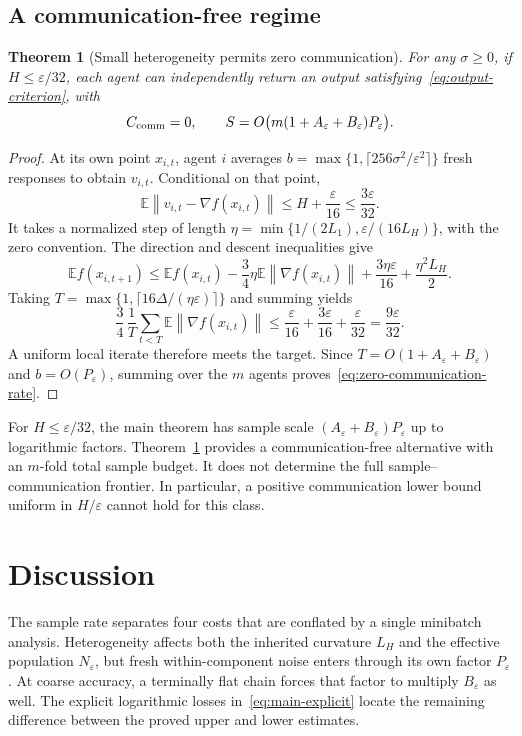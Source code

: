 \documentclass[11pt,a4paper]{article}
\newcommand{\E}{\mathbb{E}}
\newcommand{\eps}{\varepsilon}
\newcommand{\norm}[1]{\left\lVert #1\right\rVert}
\newtheorem{theorem}{Theorem}[section]
\theoremstyle{remark}
\begin{document}
\subsection{A communication-free regime}

\begin{theorem}[Small heterogeneity permits zero communication]
\label{thm:zero-communication}
For any $\sigma\ge0$, if $H\le\eps/32$, each agent can independently
return an output satisfying~\eqref{eq:output-criterion}, with
\begin{equation}
 C_{\rm comm}=0,\qquad
 S=O\bigl(m(1+A_\eps+B_\eps)P_\eps\bigr).
 \label{eq:zero-communication-rate}
\end{equation}
\end{theorem}

\begin{proof}
At its own point $x_{i,t}$, agent $i$ averages
$b=\max\{1,\lceil256\sigma^2/\eps^2\rceil\}$ fresh responses to obtain
$v_{i,t}$. Conditional on that point,
\[
 \E\norm{v_{i,t}-\nabla f(x_{i,t})}
 \le H+\frac{\eps}{16}\le\frac{3\eps}{32}.
\]
It takes a normalized step of length
$\eta=\min\{1/(2L_1),\eps/(16L_H)\}$, with the zero convention.
The direction and descent inequalities give
\[
 \E f(x_{i,t+1})\le\E f(x_{i,t})
 -\frac34\eta\E\norm{\nabla f(x_{i,t})}
 +\frac{3\eta\eps}{16}+\frac{\eta^2L_H}{2}.
\]
Taking $T=\max\{1,\lceil16\Delta/(\eta\eps)\rceil\}$ and summing yields
\[
 \frac34\,\frac1T\sum_{t<T}\E\norm{\nabla f(x_{i,t})}
 \le\frac{\eps}{16}+\frac{3\eps}{16}+\frac{\eps}{32}
 =\frac{9\eps}{32}.
\]
A uniform local iterate therefore meets the target. Since
$T=O(1+A_\eps+B_\eps)$ and $b=O(P_\eps)$, summing over the $m$ agents
proves~\eqref{eq:zero-communication-rate}.
\end{proof}

For $H\le\eps/32$, the main theorem has sample scale
$(A_\eps+B_\eps)P_\eps$ up to logarithmic factors.
Theorem~\ref{thm:zero-communication} provides a communication-free
alternative with an $m$-fold total sample budget. It does not determine the
full sample--communication frontier. In particular, a positive
communication lower bound uniform in $H/\eps$ cannot hold for this class.

\section{Discussion}

The sample rate separates four costs that are conflated by a single
minibatch analysis. Heterogeneity affects both the inherited curvature
$L_H$ and the effective population $N_\eps$, but fresh within-component
noise enters through its own factor $P_\eps$. At coarse accuracy, a
terminally flat chain forces that factor to multiply $B_\eps$ as well.
The explicit logarithmic losses in~\eqref{eq:main-explicit} locate the
remaining difference between the proved upper and lower estimates.
\end{document}
